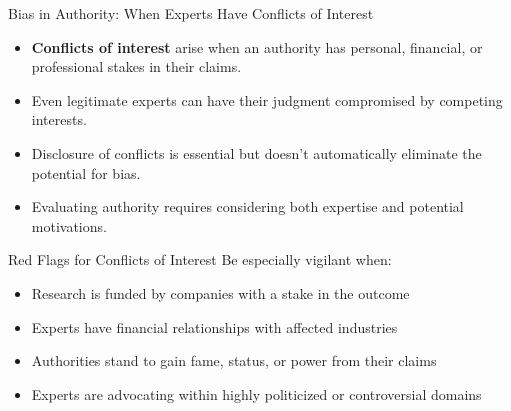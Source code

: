 \documentclass{beamer}
\begin{document}
\begin{frame}{Bias in Authority: When Experts Have Conflicts of Interest}
    \begin{itemize}
        \item \textbf{Conflicts of interest} arise when an authority has personal, financial, or professional stakes in their claims.
        \item Even legitimate experts can have their judgment compromised by competing interests.
        \item Disclosure of conflicts is essential but doesn't automatically eliminate the potential for bias.
        \item Evaluating authority requires considering both expertise and potential motivations.
    \end{itemize}
    
    \begin{alertblock}{Red Flags for Conflicts of Interest}
        Be especially vigilant when:
        \begin{itemize}
            \item Research is funded by companies with a stake in the outcome
            \item Experts have financial relationships with affected industries
            \item Authorities stand to gain fame, status, or power from their claims
            \item Experts are advocating within highly politicized or controversial domains
        \end{itemize}
    \end{alertblock}
\end{frame}
\end{document}
